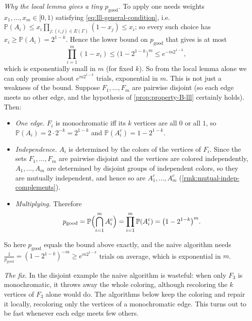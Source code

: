 \emph{Why the local lemma gives a tiny \(p_{\mathrm{good}}\).} To apply  one needs weights \(x_{1}, \ldots, x_{m} \in [0,1)\) satisfying \eqref{eq:lll-general-condition}, i.e.\ \(\mathbb{P}(A_{i}) \le x_{i} \prod_{j : (i,j) \in E(\Gamma)} (1 - x_{j}) \le x_{i}\); so every such choice has \(x_{i} \ge \mathbb{P}(A_{i}) = 2^{1-k}\). Hence the lower bound on \(p_{\mathrm{good}}\) that  gives is at most
\[
    \prod_{i=1}^{m} (1 - x_{i}) \le \bigl( 1 - 2^{1-k} \bigr)^{m} \le e^{-m 2^{1-k}} ,
\]
which is exponentially small in \(m\) (for fixed \(k\)). So from the local lemma alone we can only promise about \(e^{m 2^{1-k}}\) trials, exponential in \(m\). This is not just a weakness of the bound. Suppose \(F_{1}, \ldots, F_{m}\) are pairwise disjoint (so each edge meets no other edge, and the hypothesis of \autoref{prop:property-B-lll} certainly holds). Then:
\begin{itemize}
    \item \emph{One edge.} \(F_{i}\) is monochromatic iff its \(k\) vertices are all \(0\) or all \(1\), so \(\mathbb{P}(A_{i}) = 2 \cdot 2^{-k} = 2^{1-k}\) and \(\mathbb{P}(A_{i}^{c}) = 1 - 2^{1-k}\).
    \item \emph{Independence.} \(A_{i}\) is determined by the colors of the vertices of \(F_{i}\). Since the sets \(F_{1}, \ldots, F_{m}\) are pairwise disjoint and the vertices are colored independently, \(A_{1}, \ldots, A_{m}\) are determined by disjoint groups of independent colors, so they are mutually independent, and hence so are \(A_{1}^{c}, \ldots, A_{m}^{c}\) (\autoref{rmk:mutual-indep-complements}).
    \item \emph{Multiplying.} Therefore
    \[
        p_{\mathrm{good}} = \mathbb{P}\Bigl( \bigcap_{i=1}^{m} A_{i}^{c} \Bigr) = \prod_{i=1}^{m} \mathbb{P}(A_{i}^{c}) = \bigl( 1 - 2^{1-k} \bigr)^{m} .
    \]
\end{itemize}
So here \(p_{\mathrm{good}}\) equals the bound above exactly, and the naive algorithm needs \(\frac{1}{p_{\mathrm{good}}} = (1 - 2^{1-k})^{-m} \ge e^{m 2^{1-k}}\) trials on average, which is exponential in \(m\).

\emph{The fix.} In the disjoint example the naive algorithm is wasteful: when only \(F_{3}\) is monochromatic, it throws away the whole coloring, although recoloring the \(k\) vertices of \(F_{3}\) alone would do. The algorithms below keep the coloring and repair it locally, recoloring only the vertices of a monochromatic edge. This turns out to be fast whenever each edge meets few others.

